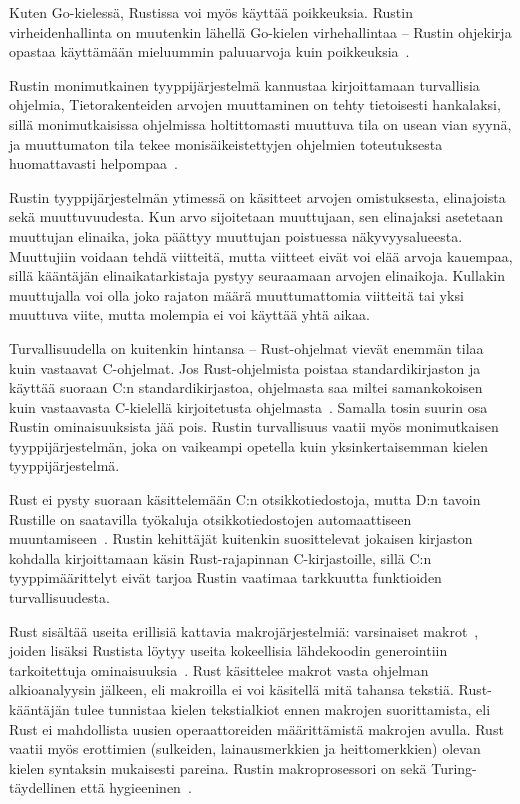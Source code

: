 Kuten Go-kielessä, Rustissa voi myös käyttää poikkeuksia. Rustin
virheidenhallinta on muutenkin lähellä Go-kielen virhehallintaa -- Rustin
ohjekirja opastaa käyttämään mieluummin paluuarvoja kuin
poikkeuksia~\citep{rusterrorhandling}.

Rustin monimutkainen tyyppijärjestelmä kannustaa kirjoittamaan turvallisia
ohjelmia, Tietorakenteiden arvojen muuttaminen on tehty tietoisesti hankalaksi,
sillä monimutkaisissa ohjelmissa holtittomasti muuttuva tila on usean vian
syynä, ja muuttumaton tila tekee monisäikeistettyjen
ohjelmien toteutuksesta huomattavasti helpompaa~\citep[luku 4, kohta
17]{effectivejava}.

Rustin tyyppijärjestelmän ytimessä on käsitteet arvojen
omistuksesta, elinajoista sekä
muuttuvuudesta. Kun arvo sijoitetaan muuttujaan, sen
elinajaksi asetetaan muuttujan elinaika, joka päättyy muuttujan poistuessa
näkyvyysalueesta. Muuttujiin voidaan tehdä viitteitä, mutta
viitteet eivät voi elää arvoja kauempaa, sillä kääntäjän
elinaikatarkistaja pystyy seuraamaan arvojen
elinaikoja. Kullakin muuttujalla voi olla joko rajaton määrä muuttumattomia
viitteitä tai yksi muuttuva viite, mutta molempia ei voi käyttää yhtä aikaa.

Turvallisuudella on kuitenkin hintansa -- Rust-ohjelmat vievät enemmän tilaa
kuin vastaavat C-ohjelmat. Jos Rust-ohjelmista poistaa standardikirjaston ja
käyttää suoraan C:n standardikirjastoa, ohjelmasta saa miltei samankokoisen
kuin vastaavasta C-kielellä kirjoitetusta ohjelmasta~\citep{rustbinarysize}.
Samalla tosin suurin osa Rustin ominaisuuksista jää pois. Rustin turvallisuus
vaatii myös monimutkaisen tyyppijärjestelmän, joka on vaikeampi opetella kuin
yksinkertaisemman kielen tyyppijärjestelmä.

Rust ei pysty suoraan käsittelemään C:n otsikkotiedostoja, mutta D:n tavoin
Rustille on saatavilla työkaluja otsikkotiedostojen automaattiseen
muuntamiseen~\citep{rustbindgen}. Rustin kehittäjät kuitenkin suosittelevat
jokaisen kirjaston kohdalla kirjoittamaan käsin Rust-rajapinnan C-kirjastoille,
sillä C:n tyyppimäärittelyt eivät tarjoa Rustin vaatimaa tarkkuutta funktioiden
turvallisuudesta.

Rust sisältää useita erillisiä kattavia makrojärjestelmiä:
varsinaiset makrot~\citep{rustmacros}, joiden lisäksi Rustista löytyy useita
kokeellisia lähdekoodin generointiin tarkoitettuja
ominaisuuksia~\citep{rustprocmacros, rustplugins}. Rust käsittelee makrot vasta
ohjelman alkioanalyysin jälkeen, eli makroilla ei voi käsitellä mitä tahansa
tekstiä. Rust-kääntäjän tulee tunnistaa kielen tekstialkiot ennen makrojen
suorittamista, eli Rust ei mahdollista uusien operaattoreiden määrittämistä
makrojen avulla. Rust vaatii myös erottimien (sulkeiden, lainausmerkkien ja
heittomerkkien) olevan kielen syntaksin mukaisesti pareina. Rustin
makroprosessori on sekä Turing-täydellinen että hygieeninen~\citep{rustmacros}.

